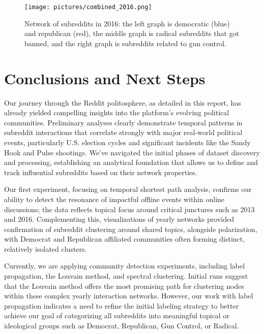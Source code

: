 \documentclass{article}
\begin{document}
\begin{figure}[H]
    \centering
    \texttt{[image: pictures/combined\_2016.png]}
    \caption{Network of subreddits in 2016: the left graph is democratic (blue) and republican (red), the middle graph is radical subreddits that got banned, and the right graph is subreddits related to gun control.}
    \label{fig:metadata-2016}
\end{figure}


\section{Conclusions and Next Steps}
Our journey through the Reddit politosphere, as detailed in this report, has already yielded compelling insights into the platform's evolving political communities. Preliminary analyses clearly demonstrate temporal patterns in subreddit interactions that correlate strongly with major real-world political events, particularly U.S. election cycles and significant incidents like the Sandy Hook and Pulse shootings. We've navigated the initial phases of dataset discovery and processing, establishing an analytical foundation that allows us to define and track influential subreddits based on their network properties. 

Our first experiment, focusing on temporal shortest path analysis, confirms our ability to detect the resonance of impactful offline events within online discussions; the data reflects topical focus around critical junctures such as 2013 and 2016. Complementing this, visualizations of yearly networks provided confirmation of subreddit clustering around shared topics, alongside polarization, with Democrat and Republican affiliated communities often forming distinct, relatively isolated clusters. 

Currently, we are applying community detection experiments, including label propagation, the Louvain method, and spectral clustering. Initial runs suggest that the Louvain method offers the most promising path for clustering nodes within these complex yearly interaction networks. However, our work with label propagation indicates a need to refine the initial labeling strategy to better achieve our goal of categorizing all subreddits into meaningful topical or ideological groups such as Democrat, Republican, Gun Control, or Radical.
\end{document}
